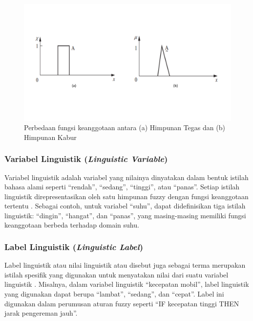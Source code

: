 \documentclass[12pt,a4paper]{article}
\theoremstyle{remark}
\begin{document}
\begin{figure}[H]
    \centering
    \includegraphics[width=1\linewidth]{images/fungsi_keanggotaan_fuzzy.pdf}
    \caption{Perbedaan fungsi keanggotaan antara (a) Himpunan Tegas dan (b) Himpunan Kabur \cite{ross_fuzzy_2016}}
    \label{fig:keanggotaan_fuzzy}
\end{figure}

\subsubsection{Variabel Linguistik (\textit{Linguistic Variable})}
Variabel linguistik adalah variabel yang nilainya dinyatakan dalam bentuk istilah bahasa alami seperti “rendah”, “sedang”, “tinggi”, atau “panas”. Setiap istilah linguistik direpresentasikan oleh satu himpunan fuzzy dengan fungsi keanggotaan tertentu \cite{zadeh_concept_1975}.
Sebagai contoh, untuk variabel “suhu”, dapat didefinisikan tiga istilah linguistik: “dingin”, “hangat”, dan “panas”, yang masing-masing memiliki fungsi keanggotaan berbeda terhadap domain suhu.

\subsubsection{Label Linguistik (\textit{Linguistic Label})}
Label linguistik atau nilai linguistik atau disebut juga sebagai terma merupakan istilah spesifik yang digunakan untuk menyatakan nilai dari suatu variabel linguistik \cite{noauthor_linguistic_nodate,rinaldi_munir_logika_2021}. Misalnya, dalam variabel linguistik “kecepatan mobil”, label linguistik yang digunakan dapat berupa “lambat”, “sedang”, dan “cepat”. Label ini digunakan dalam perumusan aturan fuzzy seperti “IF kecepatan tinggi THEN jarak pengereman jauh”.
\end{document}
